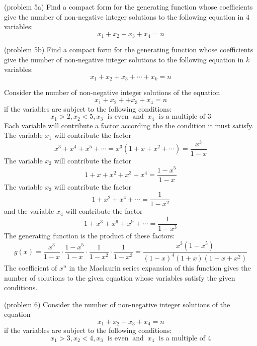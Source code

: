 \documentclass[handout]{ximera}
\begin{document}
\begin{problem}(problem 5a)
Find a compact form for the generating function whose coefficients give the number of non-negative integer solutions to the 
following equation in $4$ variables:
\[
x_1 + x_2 + x_3 + x_4 = n
\]
\end{problem}


\begin{problem}(problem 5b)
Find a compact form for the generating function whose coefficients give the number of non-negative integer solutions to the 
following equation in $k$ variables:
\[
x_1 + x_2 + x_3 + \cdots + x_k = n
\]
\end{problem}

\begin{example}[example 6]
Consider the number of non-negative integer solutions of the equation 
\[
x_1 + x_2 +  + x_3  + x_4 = n
\]
if the variables are subject to the following conditions:
\[
x_1 > 2, x_2 < 5, x_3 \; \text{ is even} \;\; \text{and} \;\; x_4 \; \text{ is a multiple of 3}
\]
Each variable will contribute a factor according the the condition it must satisfy.
The variable $x_1$ will contribute the factor 
\[
x^3 + x^4 + x^5 + \cdots = x^3(1 + x + x^2 + \cdots) = \frac{x^3}{1-x}
\]
The variable $x_2$ will contribute the factor 
\[
1+x+x^2 + x^3 + x^4 = \frac{1-x^5}{1-x}
\]
The variable $x_3$ will contribute the factor 
\[
1 +  x^2 + x^4 +  \cdots = \frac{1}{1-x^2}
\]
and the variable $x_4$ will contribute the factor 
\[
1 + x^3 + x^6 + x^9 + \cdots  = \frac{1}{1-x^3}
\]
The generating function is the product of these factors:
\[
g(x) = \frac{x^3}{1-x} \cdot \frac{1-x^5}{1-x}  \cdot \frac{1}{1-x^2} \cdot  \frac{1}{1-x^3} = \frac{x^3(1-x^5)}{(1-x)^4(1+x)(1+x+x^2)}
\]
The coefficient of $x^n$ in the Maclaurin series expansion of this function gives the number of solutions to 
the given equation whose variables satisfy the given conditions.

\end{example}


\begin{problem}(problem 6)
Consider the number of non-negative integer solutions of the equation 
\[
x_1 + x_2 +  x_3  + x_4 = n
\]
if the variables are subject to the following conditions:
\[
x_1 > 3, x_2 < 4, x_3 \; \text{ is even} \;\; \text{and} \;\; x_4 \; \text{ is a multiple of 4}
\]
\begin{multipleChoice}
\\
\\
\end{multipleChoice}

\end{problem}
\end{document}
